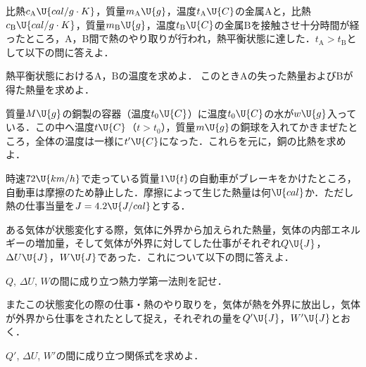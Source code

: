 \Sitei

\hspace{1zw}比熱$c_{\mathrm{A}}\U{cal/g\cdot K}$，質量$m_{\mathrm{A}}\U{g}$，温度$t_{\mathrm{A}}\U{C}$の金属$\mathrm{A}$と，比熱$c_{\mathrm{B}}\U{cal/g\cdot K}$，質量$m_{\mathrm{B}}\U{g}$，温度$t_{\mathrm{B}}\U{C}$の金属$\mathrm{B}$を接触させ十分時間が経ったところ，$\mathrm{A}$，$\mathrm{B}$間で熱のやり取りが行われ，熱平衡状態に達した．$t_{\mathrm{A}}>t_{\mathrm{B}}$として以下の問に答えよ．
\begin{komon}
 熱平衡状態における$\mathrm{A}$，$\mathrm{B}$の温度を求めよ．
 このとき$\mathrm{A}$の失った熱量および$\mathrm{B}$が得た熱量を求めよ．
\end{komon}


\hspace{1zw}質量$M\U{g}$の銅製の容器（温度$t_0\U{C}$）に温度$t_0\U{C}$の水が$w\U{g}$入っている．この中へ温度$t\U{C}$（$t>t_0$），質量$m\U{g}$の銅球を入れてかきまぜたところ，全体の温度は一様に$t'\U{C}$になった．これらを元に，銅の比熱を求めよ．


\hspace{1zw}時速$72\U{km/h}$で走っている質量$1\U{t}$の自動車がブレーキをかけたところ，自動車は摩擦のため静止した．摩擦によって生じた熱量は何$\U{cal}$か．ただし熱の仕事当量を$J=4.2\U{J/cal}$とする．


\hspace{1zw}ある気体が状態変化する際，気体に外界から加えられた熱量，気体の内部エネルギーの増加量，そして気体が外界に対してした仕事がそれぞれ$Q\U{J}$，$\Delta U\U{J}$，$W\U{J}$であった．これについて以下の問に答えよ．
\begin{komon}
 $Q$, $\Delta U$, $W$の間に成り立つ熱力学第一法則を記せ．
\end{komon}
\hspace{1zw}またこの状態変化の際の仕事・熱のやり取りを，気体が熱を外界に放出し，気体が外界から仕事をされたとして捉え，それぞれの量を$Q'\U{J}$，$W'\U{J}$とおく．
\begin{komon}
 $Q'$, $\Delta U$, $W'$の間に成り立つ関係式を求めよ．
\end{komon}



